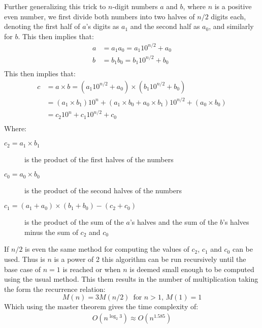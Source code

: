 \documentclass[12pt letter]{report}
\begin{document}
Further generalizing this trick to $n$-digit numbers $a$ and $b$, where $n$ is a positive even number, we first divide
both numbers into two halves of $n / 2$ digits each, denoting the first half of $a$'s digits as $a_1$ and the second
half as $a_0$, and similarly for $b$. This then implies that:
\begin{align*}
  a & = a_1a_0 = a_1 10^{n / 2} + a_0 \\
  b & = b_1b_0 = b_1 10^{n / 2} + b_0 \\
\end{align*}
This then implies that:
\begin{align*}
  c & = a \times b = \left( a_1 10^{ n / 2} + a_0 \right) \times \left( b_1 10^{n / 2} + b_0 \right)                       \\
    & = \left( a_1\times b_1 \right)10^{n} + \left( a_1 \times b_0 + a_0 \times  b_1 \right)10^{n / 2} + \left( a_0 \times
  b_0\right)                                                                                                               \\
    & = c_2 10^{n} + c_1 10^{n / 2} + c_0                                                                                  \\
\end{align*}
Where:
\begin{description}
  \item[ $c_2 = a_1 \times b_1$] is the product of the first halves of the numbers
  \item[ $c_0 = a_0 \times b_0$] is the product of the second halves of the numbers
  \item [ $c_1 = \left( a_1 + a_0 \right) \times  \left( b_1 + b_0 \right) - \left( c_2 + c_0 \right)   $] is the
        product of the sum of the $a$'s halves and the sum of the $b$'s halves minus the sum of $c_2$ and $c_0$
\end{description}

If $n / 2$ is even the same method for computing the values of $c_2$, $c_1$ and $c_0$ can be used. Thus is $n$ is a
power of 2 this algorithm can be run recursively until the base case of $n = 1$ is reached or when $n$ is deemed small
enough to be computed using the usual method. This them results in the number of multiplication taking the form the
recurrence relation:
\[
  M \left( n \right)  = 3 M \left( n / 2 \right)  \, \text{ for } n > 1, \, M \left( 1 \right) = 1
\]
Which using the master theorem gives the time complexity of:
\begin{align*}
  O \left( n^{\log_2 3} \right) \approx O \left( n^{1.585} \right)
\end{align*}
\end{document}
